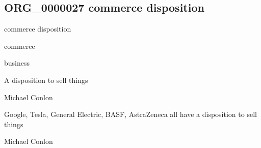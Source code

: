\documentclass[letterpaper,10pt,english]{sphinxmanual}
\begin{document}
\subsection{ORG\_0000027 \sphinxhyphen{} commerce disposition}
\label{\detokenize{doc-ORG_0000027:org-0000027-commerce-disposition}}\label{\detokenize{doc-ORG_0000027:index-0}}\label{\detokenize{doc-ORG_0000027::doc}}
\begin{sphinxShadowBox}

\sphinxAtStartPar
commerce disposition
\end{sphinxShadowBox}

\begin{sphinxShadowBox}

\sphinxAtStartPar
commerce
\end{sphinxShadowBox}

\begin{sphinxShadowBox}

\sphinxAtStartPar
business
\end{sphinxShadowBox}

\begin{sphinxShadowBox}

\sphinxAtStartPar
{\hyperref[\detokenize{doc-BFO_0000016::doc}]{}}
\end{sphinxShadowBox}

\begin{sphinxShadowBox}

\sphinxAtStartPar
A disposition to sell things
\end{sphinxShadowBox}

\begin{sphinxShadowBox}

\sphinxAtStartPar
Michael Conlon 
\end{sphinxShadowBox}

\begin{sphinxShadowBox}

\sphinxAtStartPar
Google, Tesla, General Electric, BASF, AstraZeneca all have a disposition to sell things
\end{sphinxShadowBox}

\begin{sphinxShadowBox}

\sphinxAtStartPar
Michael Conlon 
\end{sphinxShadowBox}
\begin{quote}

\ignorespaces \end{quote}
\end{document}
